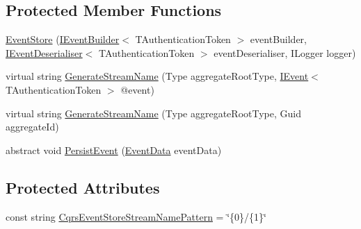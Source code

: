 \subsection*{Protected Member Functions}
\begin{DoxyCompactItemize}
\item 
\hyperlink{classCqrs_1_1Events_1_1EventStore_a6346cb2aea4c5b4e740dc6cfb15abab8_a6346cb2aea4c5b4e740dc6cfb15abab8}{Event\+Store} (\hyperlink{interfaceCqrs_1_1Events_1_1IEventBuilder}{I\+Event\+Builder}$<$ T\+Authentication\+Token $>$ event\+Builder, \hyperlink{interfaceCqrs_1_1Events_1_1IEventDeserialiser}{I\+Event\+Deserialiser}$<$ T\+Authentication\+Token $>$ event\+Deserialiser, I\+Logger logger)
\item 
virtual string \hyperlink{classCqrs_1_1Events_1_1EventStore_a03df06d4ce9c6d16201c079f2de0a7f3_a03df06d4ce9c6d16201c079f2de0a7f3}{Generate\+Stream\+Name} (Type aggregate\+Root\+Type, \hyperlink{interfaceCqrs_1_1Events_1_1IEvent}{I\+Event}$<$ T\+Authentication\+Token $>$ @event)
\item 
virtual string \hyperlink{classCqrs_1_1Events_1_1EventStore_aba61739e47fdd0f7fce656f896cbe908_aba61739e47fdd0f7fce656f896cbe908}{Generate\+Stream\+Name} (Type aggregate\+Root\+Type, Guid aggregate\+Id)
\item 
abstract void \hyperlink{classCqrs_1_1Events_1_1EventStore_aedb71ca0ddf21220e323bc60ad7508cd_aedb71ca0ddf21220e323bc60ad7508cd}{Persist\+Event} (\hyperlink{classCqrs_1_1Events_1_1EventData}{Event\+Data} event\+Data)
\end{DoxyCompactItemize}
\subsection*{Protected Attributes}
\begin{DoxyCompactItemize}
\item 
const string \hyperlink{classCqrs_1_1Events_1_1EventStore_a1e6d87995d38d6fbb148388ec165a87e_a1e6d87995d38d6fbb148388ec165a87e}{Cqrs\+Event\+Store\+Stream\+Name\+Pattern} = \char`\"{}\{0\}/\{1\}\char`\"{}
\end{DoxyCompactItemize}
